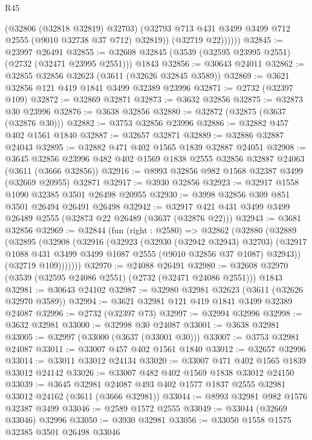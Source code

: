 \begin{lexlean}{R45}
\begin{coremodule}
                (@32806 (@32818 @32819) @32703)
                (@32793 @713 @431 @3499 @3499 @712 @2555 (@9010 @32738 @37 @712) @32819))
              (@32719 @22))))))
@32845 := @23997 @26491
@32855 := @32608 @32845 (@3539 (@32595 @23995 @2551) (@2732 (@32471 @23995 @2551))) @1843
@32856 := @30643 @24011
@32862 := @32855 @32856 @32623 (@3611 (@32626 @32845 @3589))
@32869 := @3621 @32856 @121 @419 @1841 @3499 @32389 @23996
@32871 := @2732 (@32397 @109)
@32872 := @32869 @32871
@32873 := @3632 @32856
@32875 := @32873 @30 @23996
@32876 := @3638 @32856
@32880 := @32872 (@32875 (@3637 (@32876 @30)))
@32882 := @3753 @32856 @23996
@32886 := @32882 @457 @402 @1561 @1840
@32887 := @32657 @32871
@32889 := @32886 @32887 @24043
@32895 := @32882 @471 @402 @1565 @1839 @32887 @24051
@32908 := @3645
    @32856
    @23996
    @482
    @402
    @1569
    @1838
    @2555
    @32856
    @32887
    @24063
    (@3611 (@3666 @32856))
@32916 := @8993 @32856 @982 @1568 @32387 @3499 (@32669 @20955) @32871
@32917 := @3930 @32856
@32923 := @32917 @1558 @1090 @32385 @3501 @26498 @20955
@32930 := @3998 @32856 @309 @851 @3501 @26494 @26491 @26498
@32942 := @32917 @421 @431 @3499 @3499 @26489 @2555 (@32873 @22 @26489 (@3637 (@32876 @22)))
@32943 := @3681 @32856
@32969 := @32844
    (fun (right : @2580) =>
    @32862
      (@32880
        (@32889
          (@32895
            (@32908
              (@32916
                (@32923
                  (@32930 (@32942 @32943) @32703)
                  (@32917 @1088 @431 @3499 @3499 @1087 @2555 (@9010 @32856 @37 @1087) @32943))
                (@32719 @109)))))))
@32970 := @24088 @26491
@32980 := @32608 @32970 (@3539 (@32595 @24086 @2551) (@2732 (@32471 @24086 @2551))) @1843
@32981 := @30643 @24102
@32987 := @32980 @32981 @32623 (@3611 (@32626 @32970 @3589))
@32994 := @3621 @32981 @121 @419 @1841 @3499 @32389 @24087
@32996 := @2732 (@32397 @73)
@32997 := @32994 @32996
@32998 := @3632 @32981
@33000 := @32998 @30 @24087
@33001 := @3638 @32981
@33005 := @32997 (@33000 (@3637 (@33001 @30)))
@33007 := @3753 @32981 @24087
@33011 := @33007 @457 @402 @1561 @1840
@33012 := @32657 @32996
@33014 := @33011 @33012 @24134
@33020 := @33007 @471 @402 @1565 @1839 @33012 @24142
@33026 := @33007 @482 @402 @1569 @1838 @33012 @24150
@33039 := @3645
    @32981
    @24087
    @493
    @402
    @1577
    @1837
    @2555
    @32981
    @33012
    @24162
    (@3611 (@3666 @32981))
@33044 := @8993 @32981 @982 @1576 @32387 @3499
@33046 := @2589 @1572 @2555
@33049 := @33044 (@32669 @33046) @32996
@33050 := @3930 @32981
@33056 := @33050 @1558 @1575 @32385 @3501 @26498 @33046

\end{coremodule}
\end{lexlean}
